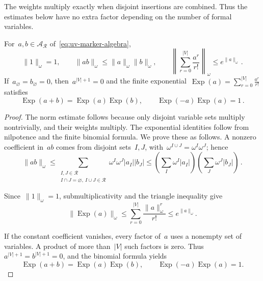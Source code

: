 The weights multiply exactly when disjoint insertions are combined.
Thus the estimates below have no extra factor depending on the number of formal variables.

\begin{proposition}\label{prop:uv-marker}
For~$a,b\in\mathcal A_{\mathcal R}$ of~\eqref{eq:uv-marker-algebra},
\begin{equation}\label{eq:uv-marker-norm}
 \|1\|_\omega=1,\qquad \|ab\|_\omega\le\|a\|_\omega\|b\|_\omega,\qquad
 \left\|\sum_{r=0}^{|V|}\frac{a^r}{r!}\right\|_\omega\le e^{\|a\|_\omega}\,.
\end{equation}
If~$a_\varnothing=b_\varnothing=0$, then~$a^{|V|+1}=0$ and the finite exponential~$\operatorname{Exp}(a)=\sum_{r=0}^{|V|}\frac{a^r}{r!}$ satisfies
\begin{equation}\label{eq:uv-marker-exponential}
 \operatorname{Exp}(a+b)=\operatorname{Exp}(a)\operatorname{Exp}(b),\qquad
 \operatorname{Exp}(-a)\operatorname{Exp}(a)=1\,.
\end{equation}
\end{proposition}

\begin{proof}
The norm estimate follows because only disjoint variable sets multiply nontrivially, and their weights multiply.
The exponential identities follow from nilpotence and the finite binomial formula.
We prove these as follows.
 A nonzero coefficient in~$ab$ comes from disjoint sets~$I,J$, with~$\omega^{I\cup J}=\omega^I\omega^J$; hence
\begin{equation*}
 \|ab\|_\omega
 \le\sum_{\substack{I,J\in\mathcal R\\I\cap J=\varnothing,\ I\cup J\in\mathcal R}}
       \omega^I\omega^J|a_I||b_J|
 \le\left(\sum_I\omega^I|a_I|\right)\left(\sum_J\omega^J|b_J|\right)\,.
\end{equation*}

Since~$\|1\|_\omega=1$, submultiplicativity and the triangle inequality give
\begin{equation*}
 \|\operatorname{Exp}(a)\|_\omega
 \le\sum_{r=0}^{|V|}\frac{\|a\|_\omega^r}{r!}
 \le e^{\|a\|_\omega}.
\end{equation*}

If the constant coefficient vanishes, every factor of~$a$ uses a nonempty set of variables.
A product of more than~$|V|$ such factors is zero.
Thus~$a^{|V|+1}=b^{|V|+1}=0$, and the binomial formula yields
\begin{equation*}
 \operatorname{Exp}(a+b)=\operatorname{Exp}(a)\operatorname{Exp}(b),
 \qquad \operatorname{Exp}(-a)\operatorname{Exp}(a)=1.
\end{equation*}
\end{proof}

